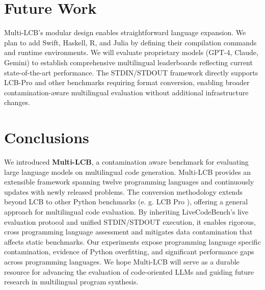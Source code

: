 \documentclass{llmxive}
\providecommand{\addcontentsline}[3]{}
\begin{document}
\section{Future Work}

Multi-LCB's modular design enables straightforward language expansion. We plan to add Swift, Haskell, R, and Julia by defining their compilation commands and runtime environments. %
We will evaluate proprietary models (GPT-4, Claude, Gemini) to establish comprehensive multilingual leaderboards reflecting current state-of-the-art performance. The STDIN/STDOUT framework directly supports LCB-Pro \citep{zheng2025livecodebench} and other benchmarks requiring format conversion, enabling broader contamination-aware multilingual evaluation without additional infrastructure changes.


\section{Conclusions}

We introduced \textbf{Multi-LCB}, a contamination aware benchmark for evaluating large language models on multilingual code generation. Multi-LCB provides an extensible framework spanning twelve programming languages and continuously updates with newly released problems. The conversion methodology extends beyond LCB to other Python benchmarks (e. g. LCB Pro \citep{zheng2025livecodebench}), offering a general approach for multilingual code evaluation. By inheriting LiveCodeBench’s live evaluation protocol and unified STDIN/STDOUT execution, it enables rigorous, cross programming language assessment and mitigates data contamination that affects static benchmarks. Our experiments expose programming language specific contamination, evidence of Python overfitting, and significant performance gaps across programming languages.  
We hope Multi-LCB will serve as a durable resource for advancing the evaluation of code-oriented LLMs and guiding future research in multilingual program synthesis.







\appendix



\addcontentsline{toc}{part}{Appendix} %
\end{document}
